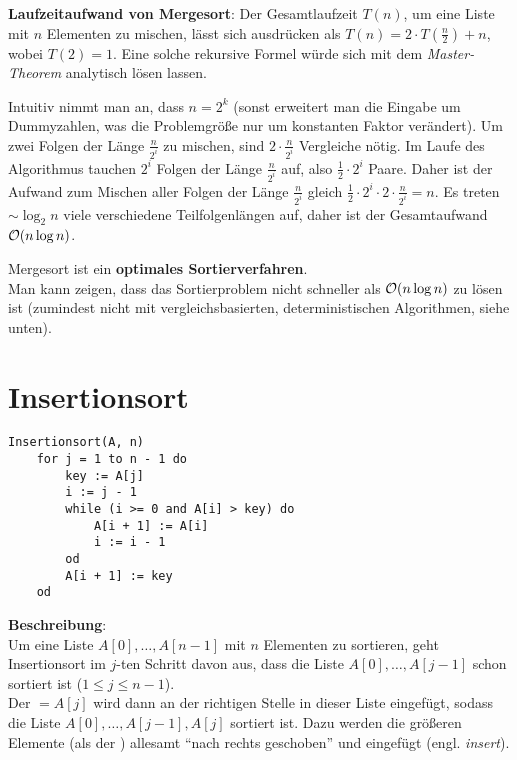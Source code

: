 \linie

\textbf{Laufzeitaufwand von Mergesort}: Der Gesamtlaufzeit $T(n)$, um
eine Liste mit $n$ Elementen zu mischen, lässt sich ausdrücken als
$T(n) = 2 \cdot T(\frac{n}{2}) + n$, wobei $T(2) = 1$.
Eine solche rekursive Formel würde sich mit dem \emph{Master-Theorem}
analytisch lösen lassen.

Intuitiv nimmt man an, dass $n = 2^k$ (sonst erweitert man die Eingabe um
Dummyzahlen, was die Problemgröße nur um konstanten Faktor verändert).
Um zwei Folgen der Länge $\frac{n}{2^i}$ zu mischen, sind
$2 \cdot \frac{n}{2^i}$ Vergleiche nötig.
Im Laufe des Algorithmus tauchen $2^i$ Folgen der Länge $\frac{n}{2^i}$ auf,
also $\frac{1}{2} \cdot 2^i$ Paare.
Daher ist der Aufwand zum Mischen aller Folgen der Länge $\frac{n}{2^i}$
gleich $\frac{1}{2} \cdot 2^i \cdot 2 \cdot \frac{n}{2^i} = n$.
Es treten $\sim \log_2 n$ viele verschiedene Teilfolgenlängen auf,
daher ist der Gesamtaufwand $\mathcal{O}(n \log n)$.

Mergesort ist ein \textbf{optimales Sortierverfahren}. \\
Man kann zeigen, dass das Sortierproblem nicht schneller als
$\mathcal{O}(n \log n)$ zu lösen ist
(zumindest nicht mit vergleichsbasierten, deterministischen Algorithmen,
siehe unten).

\pagebreak

\section{%
    Insertionsort%
}

\begin{lstlisting}
Insertionsort(A, n)
    for j = 1 to n - 1 do
        key := A[j]
        i := j - 1
        while (i >= 0 and A[i] > key) do
            A[i + 1] := A[i]
            i := i - 1
        od
        A[i + 1] := key
    od
\end{lstlisting}

\textbf{Beschreibung}: \\
Um eine Liste $A[0], \ldots, A[n - 1]$ mit $n$ Elementen zu sortieren, geht
Insertionsort im $j$-ten Schritt davon aus, dass die
Liste $A[0], \ldots, A[j - 1]$
schon sortiert ist ($1 \le j \le n - 1$). \\
Der  $= A[j]$ wird dann an der richtigen Stelle in dieser Liste
eingefügt, sodass die Liste
$A[0], \ldots, A[j - 1], A[j]$ sortiert ist.
Dazu werden die größeren Elemente (als der ) allesamt
"`nach rechts geschoben"' und  eingefügt (engl. \emph{insert}).

